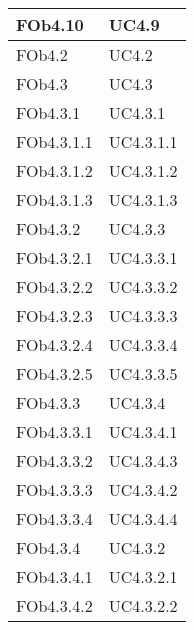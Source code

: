 \begin{longtable}{|l|p{4cm}|}
\hline
FOb4.10 & UC4.9 \linebreak  \\ 
\hline
FOb4.2 & UC4.2 \linebreak  \\ 
\hline
FOb4.3 & UC4.3 \linebreak  \\ 
\hline
FOb4.3.1 & UC4.3.1 \linebreak  \\ 
\hline
FOb4.3.1.1 & UC4.3.1.1 \linebreak  \\ 
\hline
FOb4.3.1.2 & UC4.3.1.2 \linebreak  \\ 
\hline
FOb4.3.1.3 & UC4.3.1.3 \linebreak  \\ 
\hline
FOb4.3.2 & UC4.3.3 \linebreak  \\ 
\hline
FOb4.3.2.1 & UC4.3.3.1 \linebreak  \\ 
\hline
FOb4.3.2.2 & UC4.3.3.2 \linebreak  \\ 
\hline
FOb4.3.2.3 & UC4.3.3.3 \linebreak  \\ 
\hline
FOb4.3.2.4 & UC4.3.3.4 \linebreak  \\ 
\hline
FOb4.3.2.5 & UC4.3.3.5 \linebreak  \\ 
\hline
FOb4.3.3 & UC4.3.4 \linebreak  \\ 
\hline
FOb4.3.3.1 & UC4.3.4.1 \linebreak  \\ 
\hline
FOb4.3.3.2 & UC4.3.4.3 \linebreak  \\ 
\hline
FOb4.3.3.3 & UC4.3.4.2 \linebreak  \\ 
\hline
FOb4.3.3.4 & UC4.3.4.4 \linebreak  \\ 
\hline
FOb4.3.4 & UC4.3.2 \linebreak  \\ 
\hline
FOb4.3.4.1 & UC4.3.2.1 \linebreak  \\ 
\hline
FOb4.3.4.2 & UC4.3.2.2 \linebreak  \\ 

\end{longtable}
